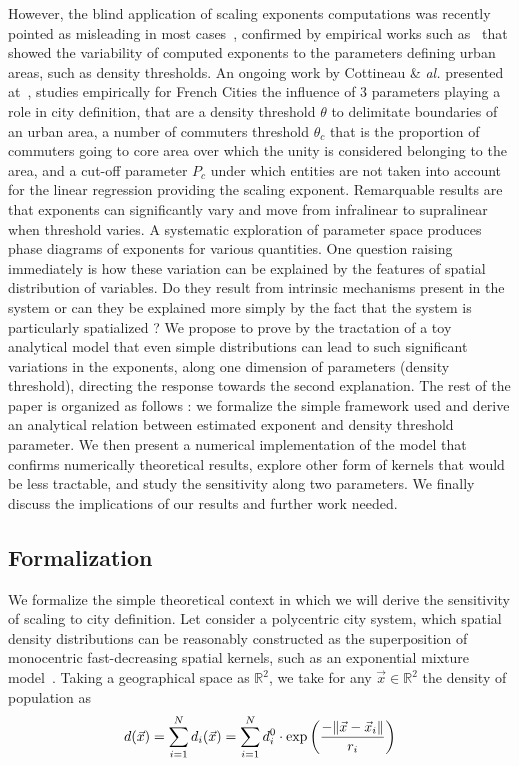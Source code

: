 However, the blind application of scaling exponents computations was recently pointed as misleading in most cases~\cite{louf2014scaling}, confirmed by empirical works such as~\cite{2013arXiv1301.1674A} that showed the variability of computed exponents to the parameters defining urban areas, such as density thresholds. An ongoing work by Cottineau \& \textit{al.} presented at~\cite{cottineau2015scaling}, studies empirically for French Cities the influence of 3 parameters playing a role in city definition, that are a density threshold $\theta$ to delimitate boundaries of an urban area, a number of commuters threshold $\theta_c$ that is the proportion of commuters going to core area over which the unity is considered belonging to the area, and a cut-off parameter $P_c$ under which entities are not taken into account for the linear regression providing the scaling exponent. Remarquable results are that exponents can significantly vary and move from infralinear to supralinear when threshold varies. A systematic exploration of parameter space produces phase diagrams of exponents for various quantities. One question raising immediately is how these variation can be explained by the features of spatial distribution of variables. Do they result from intrinsic mechanisms present in the system or can they be explained more simply by the fact that the system is particularly spatialized ? We propose to prove by the tractation of a toy analytical model that even simple distributions can lead to such significant variations in the exponents, along one dimension of parameters (density threshold), directing the response towards the second explanation. The rest of the paper is organized as follows : we formalize the simple framework used and derive an analytical relation between estimated exponent and density threshold parameter. We then present a numerical implementation of the model that confirms numerically theoretical results, explore other form of kernels that would be less tractable, and study the sensitivity along two parameters. We finally discuss the implications of our results and further work needed.

\subsection{Formalization}
\label{sec:formalization}

We formalize the simple theoretical context in which we will derive the sensitivity of scaling to city definition. Let consider a polycentric city system, which spatial density distributions can be reasonably constructed as the superposition of monocentric fast-decreasing spatial kernels, such as an exponential mixture model~\cite{anas1998urban}. Taking a geographical space as $\mathbb{R}^2$, we take for any $\vec{x}\in\mathbb{R}^2$ the density of population as
\begin{equation}
d(\vec{x}) = \sum_{i=1}^{N}{d_i(\vec{x})} = \sum_{i=1}^{N}{d_i^0\cdot \exp{\left(\frac{-\| \vec{x}-\vec{x}_i \|}{r_i}\right)}}
\end{equation}

